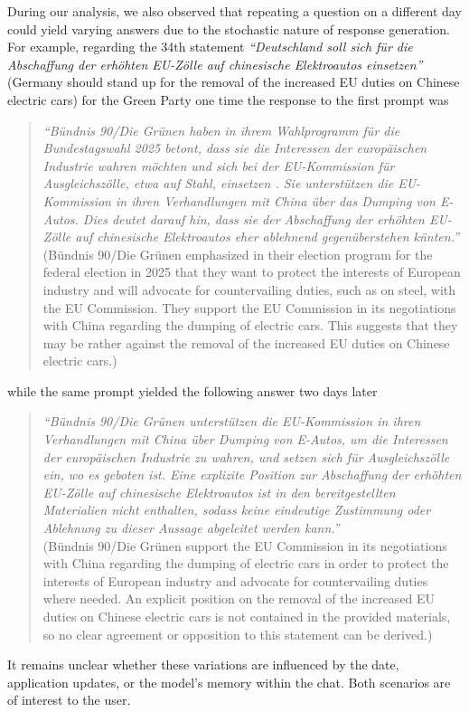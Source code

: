\documentclass[
	fontsize=10pt,          %
	numbers=noenddot,    	%
    parskip=half,        	%
    listof=totoc,        	%
    bibliography=totoc,  	%
	headsepline=true,       %
	footsepline=false, 		%
    DIV=12                	%
]{scrartcl}
\begin{document}
During our analysis, we also observed that repeating a question on a different day could yield varying answers due to the stochastic nature of response generation. 
For example, regarding the 34th statement
\emph{``Deutschland soll sich für die Abschaffung der erhöhten EU-Zölle auf chinesische Elektroautos einsetzen''} (Germany should stand up for the removal of the increased EU duties on Chinese electric cars) for the Green Party one time the response to the first prompt was 
\begin{quote}
 \small \emph{``B\"undnis 90/Die Gr\"unen haben in ihrem Wahlprogramm für die Bundestagswahl 2025 betont, dass sie die Interessen der europ\"aischen Industrie wahren m\"ochten und sich bei der EU-Kommission für Ausgleichsz\"olle, etwa auf Stahl, einsetzen . Sie unterst\"utzen die EU-Kommission in ihren Verhandlungen mit China \"uber das Dumping von E-Autos. Dies deutet darauf hin, dass sie der Abschaffung der erhöhten EU-Z\"olle auf chinesische Elektroautos eher ablehnend gegen\"uberstehen k\"nnten.''} 
 \\(B\"undnis 90/Die Gr\"unen emphasized in their election program for the federal election in 2025 that they want to protect the interests of European industry and will advocate for countervailing duties, such as on steel, with the EU Commission. They support the EU Commission in its negotiations with China regarding the dumping of electric cars. This suggests that they may be rather against the removal of the increased EU duties on Chinese electric cars.)
\end{quote}
while the same prompt yielded the following answer two days later
\begin{quote}
 \small \emph{``B\"undnis 90/Die Gr\"unen unterst\"utzen die EU-Kommission in ihren Verhandlungen mit China über Dumping von E-Autos, um die Interessen der europ\"aischen Industrie zu wahren, und setzen sich für Ausgleichsz\"olle ein, wo es geboten ist. Eine explizite Position zur Abschaffung der erh\"ohten EU-Z\"olle auf chinesische Elektroautos ist in den bereitgestellten Materialien nicht enthalten, sodass keine eindeutige Zustimmung oder Ablehnung zu dieser Aussage abgeleitet werden kann.''}
 \\(B\"undnis 90/Die Gr\"unen support the EU Commission in its negotiations with China regarding the dumping of electric cars in order to protect the interests of European industry and advocate for countervailing duties where needed. An explicit position on the removal of the increased EU duties on Chinese electric cars is not contained in the provided materials, so no clear agreement or opposition to this statement can be derived.)
\end{quote}
It remains unclear whether these variations are influenced by the date, application updates, or the model's memory within the chat. Both scenarios are of interest to the user.
\end{document}
